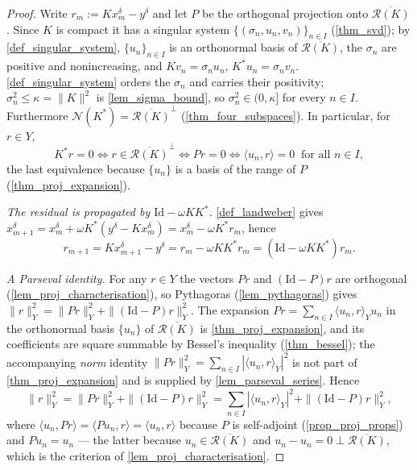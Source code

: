 \documentclass[a4paper]{report}
\theoremstyle{plain}
\theoremstyle{definition}
\theoremstyle{remark}
\newcommand{\Ran}{\mathcal{R}}
\newcommand{\Ker}{\mathcal{N}}
\newcommand{\Id}{\mathrm{Id}}
\begin{document}
\begin{proof}
  Write $r_m := Kx^{\delta}_m - y^{\delta}$ and let $P$ be the orthogonal projection onto
  $\overline{\Ran(K)}$.  Since $K$ is compact it has a singular system
  $\{(\sigma_n,u_n,v_n)\}_{n \in I}$ (\cref{thm_svd}); by \cref{def_singular_system},
  $\{u_n\}_{n \in I}$ is an orthonormal basis of $\overline{\Ran(K)}$, the $\sigma_n$ are
  positive and nonincreasing, and $Kv_n = \sigma_n u_n$, $K^{*}u_n = \sigma_n v_n$.
  \cref{def_singular_system} orders the $\sigma_n$ and carries their positivity;
  $\sigma_n^{2} \le \kappa = \|K\|^{2}$ is \cref{lem_sigma_bound}, so
  $\sigma_n^{2} \in (0,\kappa]$ for every $n \in I$.  Furthermore
  $\Ker(K^{*}) = \overline{\Ran(K)}^{\perp}$
  (\cref{thm_four_subspaces}).  In particular, for $r \in Y$,
  \begin{equation}\label{eq_lw_ker_adj}
    K^{*}r = 0
    \iff r \in \overline{\Ran(K)}^{\perp}
    \iff Pr = 0
    \iff \langle u_n, r\rangle = 0 \ \text{ for all } n \in I ,
  \end{equation}
  the last equivalence because $\{u_n\}$ is a basis of the range of $P$
  (\cref{thm_proj_expansion}).

  \emph{The residual is propagated by $\Id - \omega KK^{*}$.}  \cref{def_landweber} gives
  $x^{\delta}_{m+1} = x^{\delta}_m + \omega K^{*}(y^{\delta} - Kx^{\delta}_m) =
  x^{\delta}_m - \omega K^{*}r_m$, hence
  \begin{equation}\label{eq_lw_res_step}
    r_{m+1} = Kx^{\delta}_{m+1} - y^{\delta} = r_m - \omega KK^{*}r_m
      = (\Id - \omega KK^{*})r_m .
  \end{equation}

  \emph{A Parseval identity.}  For any $r \in Y$ the vectors $Pr$ and $(\Id - P)r$ are
  orthogonal (\cref{lem_proj_characterisation}), so Pythagoras (\cref{lem_pythagoras}) gives
  $\|r\|_Y^{2} = \|Pr\|_Y^{2} + \|(\Id - P)r\|_Y^{2}$.  The expansion
  $Pr = \sum_{n \in I}\langle u_n, r\rangle_Y u_n$ in the orthonormal basis $\{u_n\}$ of
  $\overline{\Ran(K)}$ is \cref{thm_proj_expansion}, and its coefficients are square
  summable by Bessel's inequality (\cref{thm_bessel}); the accompanying \emph{norm}
  identity $\|Pr\|_Y^{2} = \sum_{n \in I}|\langle u_n,r\rangle_Y|^{2}$ is not part of
  \cref{thm_proj_expansion} and is supplied by \cref{lem_parseval_series}.  Hence
  \begin{equation}\label{eq_lw_parseval}
    \|r\|_Y^{2} = \|Pr\|_Y^{2} + \|(\Id - P)r\|_Y^{2}
      = \sum_{n \in I}|\langle u_n, r\rangle_Y|^{2} + \|(\Id - P)r\|_Y^{2} ,
  \end{equation}
  where $\langle u_n, Pr\rangle = \langle Pu_n, r\rangle = \langle u_n, r\rangle$ because
  $P$ is self-adjoint (\cref{prop_proj_props}) and $Pu_n = u_n$ --- the latter because
  $u_n \in \overline{\Ran(K)}$ and $u_n - u_n = 0 \perp \overline{\Ran(K)}$, which is the
  criterion of \cref{lem_proj_characterisation}.


\end{proof}
\end{document}
